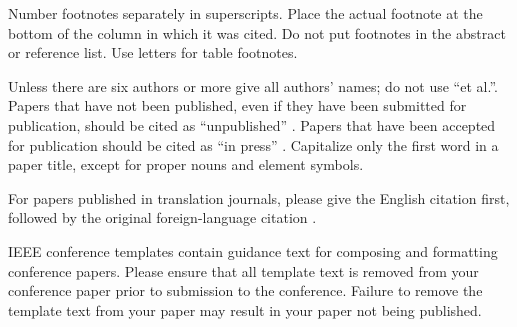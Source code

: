 \documentclass[conference]{IEEEtran}
\begin{document}
Number footnotes separately in superscripts. Place the actual footnote at 
the bottom of the column in which it was cited. Do not put footnotes in the 
abstract or reference list. Use letters for table footnotes.

Unless there are six authors or more give all authors' names; do not use 
``et al.''. Papers that have not been published, even if they have been 
submitted for publication, should be cited as ``unpublished'' \cite{b4}. Papers 
that have been accepted for publication should be cited as ``in press'' \cite{b5}. 
Capitalize only the first word in a paper title, except for proper nouns and 
element symbols.

For papers published in translation journals, please give the English 
citation first, followed by the original foreign-language citation \cite{b6}.


\vspace{12pt}
\color{red}
IEEE conference templates contain guidance text for composing and formatting conference papers. Please ensure that all template text is removed from your conference paper prior to submission to the conference. Failure to remove the template text from your paper may result in your paper not being published.
\end{document}

